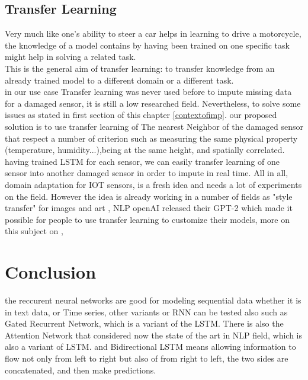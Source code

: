 \subsection{Transfer Learning}
Very much like one's ability to steer a car helps in learning to drive a motorcycle, the knowledge of a model contains by having been trained on one specific task might help in solving a related task.\\This is the general aim of transfer learning: to transfer knowledge from an already trained model to a different domain or a different task.\\ in our use case Transfer learning was never used before to impute missing data for a damaged sensor, it is still a low researched field. Nevertheless, to solve some issues as stated in first section of this chapter \ref{contextofimp}. our proposed solution is to use transfer learning of The nearest Neighbor of the damaged sensor that respect a number of  criterion  such as measuring the same physical property (temperature, humidity...),being at the same height, and spatially correlated. having trained LSTM for each sensor, we can easily transfer learning of one sensor into another damaged sensor in order to impute in real time. All in all, domain adaptation for IOT sensors, is a fresh idea and needs a lot of experiments on the field. However the idea is already working in a number of fields as "style transfer" for images and art \cite{transferlearning}, NLP openAI released their GPT-2 which made it possible for people to use transfer learning to customize their models, more on this subject on \cite{nlp},   


\section{Conclusion}
the reccurent neural networks are good for modeling sequential data whether it is in text data, or Time series, other variants or RNN can be tested also such as  Gated Recurrent Network, which is a variant of the LSTM. There is also the Attention Network that considered now the state of the art in NLP field, which is also a variant of LSTM. and Bidirectional LSTM means allowing information to flow not only from left to right but also of from right to left, the two sides are concatenated, and then make predictions. 

